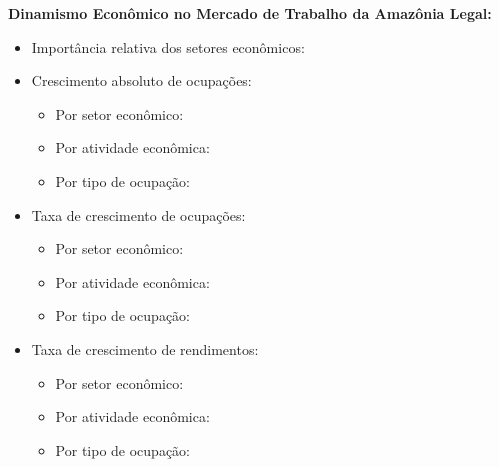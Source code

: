 \documentclass[10pt]{beamer}
\begin{document}
\begin{frame}[label=indice_principal_amz]{}

\textit{\hyperlink{indice_principal}{}}

\textbf{Dinamismo Econômico no Mercado de Trabalho da Amazônia Legal:}
\vspace{2mm}
\begin{itemize}

\item{Importância relativa dos setores econômicos: \hyperlink{_importancia_relativa}{}}
\vspace{1mm}

\item{Crescimento  absoluto de ocupações:
	\begin{itemize}
	\item{Por setor econômico: \hyperlink{rkngnocuporsetor}{}}
	\item{Por atividade econômica: \hyperlink{rkngnocuporatividade}{}}
	\item{Por tipo de ocupação: \hyperlink{rkngnocuporocupacao}{}}
	\end{itemize}
}
\vspace{1mm}

\item{Taxa de crescimento de ocupações:
	\begin{itemize}
	\item{Por setor econômico: \hyperlink{rkngtxocuporsetor}{}}
	\item{Por atividade econômica: \hyperlink{rkngtxocuporatividade}{}}
	\item{Por tipo de ocupação: \hyperlink{rkngtxocuporocupacao}{}}
	\end{itemize}
}
\vspace{1mm}

\item{Taxa de crescimento de rendimentos:
	\begin{itemize}
	\item{Por setor econômico: \hyperlink{rkngtxrendaporsetor}{}}
	\item{Por atividade econômica: \hyperlink{rkngtxrendaporatividade}{}}
	\item{Por tipo de ocupação: \hyperlink{rkngtxrendaporocupacao}{}}
	\end{itemize}
}
\vspace{1mm}

\end{itemize}

\end{frame}
\end{document}

